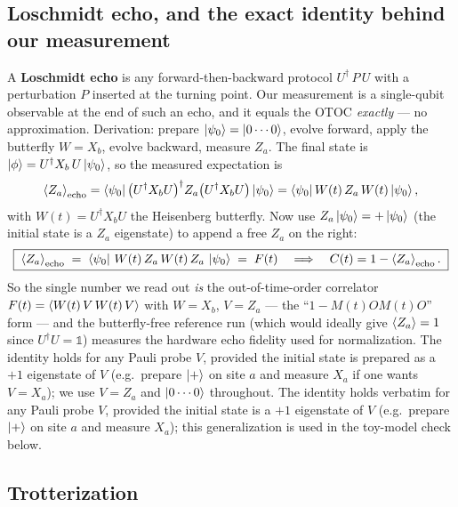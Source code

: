 \documentclass[11pt]{article}
\begin{document}
\subsection{Loschmidt echo, and the exact identity behind our measurement}
\label{sec:echoderivation}

A \textbf{Loschmidt echo} is any forward-then-backward protocol
$U^\dagger \, P \, U$ with a perturbation $P$ inserted at the turning point.
Our measurement is a single-qubit observable at the end of such an echo, and
it equals the OTOC \emph{exactly} --- no approximation. Derivation: prepare
$\ket{\psi_0}=\ket{0\cdots 0}$, evolve forward, apply the butterfly
$W = X_b$, evolve backward, measure $Z_a$. The final state is
$\ket{\phi} = U^\dagger X_b\, U \ket{\psi_0}$, so the measured expectation is
\begin{equation}
  \expval{Z_a}_{\mathrm{echo}}
  = \bra{\psi_0} \big(U^\dagger X_b U\big)^\dagger Z_a
    \big(U^\dagger X_b U\big) \ket{\psi_0}
  = \bra{\psi_0} W(t)\, Z_a\, W(t) \ket{\psi_0},
\end{equation}
with $W(t) = U^\dagger X_b U$ the Heisenberg butterfly. Now use
$Z_a\ket{\psi_0} = +\ket{\psi_0}$ (the initial state is a $Z_a$ eigenstate)
to append a free $Z_a$ on the right:
\begin{equation}
  \boxed{\;
  \expval{Z_a}_{\mathrm{echo}}
  \;=\; \bra{\psi_0}\, W(t)\, Z_a\, W(t)\, Z_a \,\ket{\psi_0}
  \;=\; F(t)
  \quad\Longrightarrow\quad
  C(t) = 1 - \expval{Z_a}_{\mathrm{echo}} .
  \;}
  \label{eq:echoidentity}
\end{equation}
So the single number we read out \emph{is} the out-of-time-order correlator
$F(t)=\expval{W(t)\,V\,W(t)\,V}$ with $W=X_b$, $V=Z_a$ --- the
``$1-M(t)OM(t)O$'' form --- and the butterfly-free reference run (which would
ideally give $\expval{Z_a}=1$ since $U^\dagger U = \mathbb{1}$) measures the
hardware echo fidelity used for normalization. The identity holds for any
Pauli probe $V$, provided the initial state is prepared as a $+1$ eigenstate
of $V$ (e.g.\ prepare $\ket{+}$ on site $a$ and measure $X_a$ if one wants
$V=X_a$); we use $V=Z_a$ and $\ket{0\cdots0}$ throughout. The identity holds verbatim
for any Pauli probe $V$, provided the initial state is a $+1$ eigenstate of
$V$ (e.g.\ prepare $\ket{+}$ on site $a$ and measure $X_a$); this
generalization is used in the toy-model check below.

\subsection{Trotterization}
\end{document}
